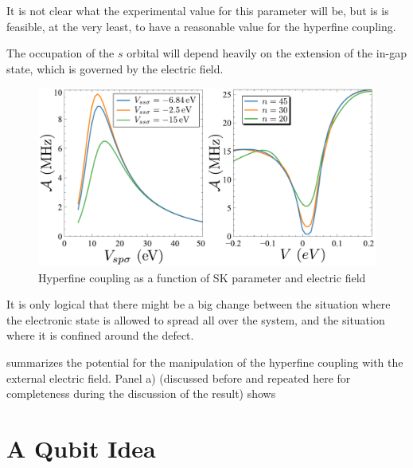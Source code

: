 
It is not clear what the experimental value for this parameter will be, but is is feasible, at the very least, to have a reasonable value for the hyperfine coupling.

The occupation of the $s$ orbital will depend heavily on the extension of the in-gap state, which is governed by the electric field.

\begin{figure}[h!]
\centering
\includegraphics{defects/fig/hyperfine.pdf}
\vspace{-5pt}
\caption{Hyperfine coupling as a function of SK parameter and electric field}
\label{hyperfine_elec}
\end{figure}
\FloatBarrier

It is only logical that there might be a big change between the situation where the electronic state is allowed to spread all over the system, and the situation where it is confined around the defect.

 summarizes the potential for the manipulation of the hyperfine coupling with the external electric field. Panel a) (discussed before and repeated here for completeness during the discussion of the result) shows


\section{A Qubit Idea}

